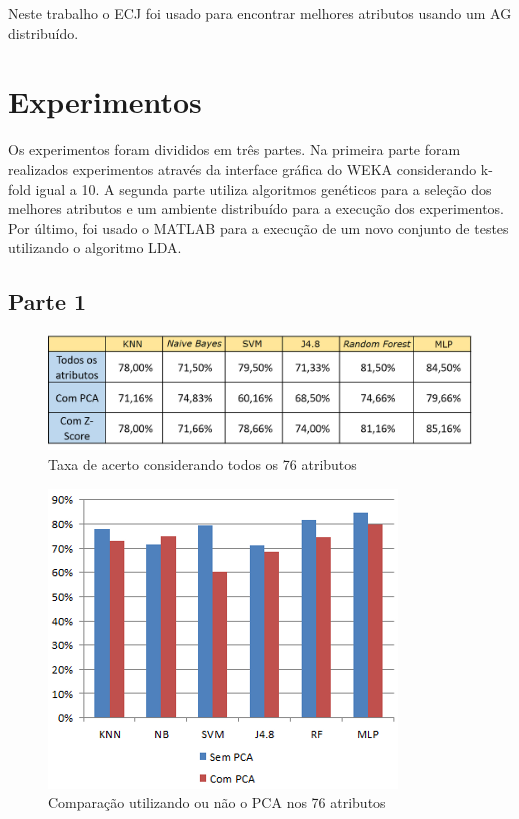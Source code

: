 \documentclass[conference]{IEEEtran}
\begin{document}
Neste trabalho o ECJ foi usado para encontrar melhores atributos usando um AG distribuído.
 
\section{Experimentos}

Os experimentos foram divididos em três partes. Na primeira parte foram realizados experimentos através da interface gráfica do WEKA considerando k-fold igual a 10. A segunda parte utiliza algoritmos genéticos para a seleção dos melhores atributos e um ambiente distribuído para a execução dos experimentos. Por último, foi usado o MATLAB para a execução de um novo conjunto de testes utilizando o algoritmo LDA.

\subsection{Parte 1}

\begin{figure}
\centering
\includegraphics[scale=0.22]{all_atributes.png}
\caption{Taxa de acerto considerando todos os 76 atributos}
\label{figura:all_atributes}
\end{figure}

\begin{figure}
\centering
\includegraphics[scale=0.8]{pca76.png}
\caption{Comparação utilizando ou não o PCA nos 76 atributos}
\label{figura:pca76}
\end{figure}
\end{document}

